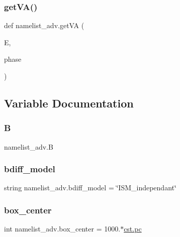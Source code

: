 \subsubsection{\texorpdfstring{get\+V\+A()}{getVA()}}
{\footnotesize\ttfamily def namelist\+\_\+adv.\+get\+VA (\begin{DoxyParamCaption}\item[{}]{E,  }\item[{}]{phase }\end{DoxyParamCaption})}



\subsection{Variable Documentation}
\mbox{\label{namespacenamelist__adv_a375539f1a9c2e7e2e879f164603f4a93}} 
\subsubsection{\texorpdfstring{B}{B}}
{\footnotesize\ttfamily namelist\+\_\+adv.\+B}

\mbox{\label{namespacenamelist__adv_a5546779b28436d7f167f9e11e18367fe}} 
\subsubsection{\texorpdfstring{bdiff\+\_\+model}{bdiff\_model}}
{\footnotesize\ttfamily string namelist\+\_\+adv.\+bdiff\+\_\+model = \char`\"{}I\+S\+M\+\_\+independant\char`\"{}}

\mbox{\label{namespacenamelist__adv_a9926b4bebb1968add3374e18e66fccf4}} 
\subsubsection{\texorpdfstring{box\+\_\+center}{box\_center}}
{\footnotesize\ttfamily int namelist\+\_\+adv.\+box\+\_\+center = 1000.$\ast$\hyperlink{constants_8h_a2884cd030c4c825754349a525a1d06ce}{cst.\+pc}}

